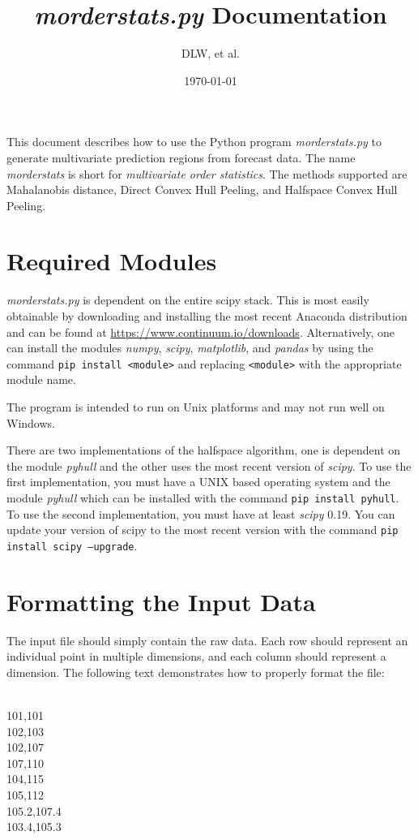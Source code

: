 \documentclass[11pt]{article}
\title{\textit{morderstats.py} Documentation}
\author{DLW, et al.}
\date{\today}
\begin{document}
\maketitle

This document describes how to use the Python program
\textit{morderstats.py} to generate multivariate prediction regions
from forecast data. The name \textit{morderstats} is short for
\textit{multivariate order statistics}. The methods supported are
Mahalanobis distance, Direct Convex Hull Peeling, and Halfspace Convex
Hull Peeling.

\section{Required Modules}

\textit{morderstats.py} is dependent on the entire scipy stack. This is most easily obtainable by downloading and installing the most recent Anaconda distribution and can be found at  \url{https://www.continuum.io/downloads}. Alternatively, one can install the modules \textit{numpy}, \textit{scipy}, \textit{matplotlib}, and \textit{pandas} by using the command \texttt{pip install <module>} and replacing \texttt{<module>} with the appropriate module name. 

The program is intended to run on Unix platforms and may not run well on Windows.

There are two implementations of the halfspace algorithm, one is dependent on the module \textit{pyhull} and the other uses the most recent version of \textit{scipy}. To use the first implementation, you must have a UNIX based operating system and the module \textit{pyhull} which can be installed with the command \texttt{pip install pyhull}. To use the second implementation, you must have at least \textit{scipy} 0.19. You can update your version of scipy to the most recent version with the command \texttt{pip install scipy --upgrade}.

\section{Formatting the Input Data}

The input file should simply contain the raw data. Each row should represent an individual point in multiple dimensions, and each column should represent a dimension. The following text demonstrates how to properly format the file:

\begin{framed}
	\noindent
\\
101,101\\
102,103\\
102,107\\
107,110\\
104,115\\
105,112\\
105.2,107.4\\
103.4,105.3\\
\end{framed}
\end{document}

